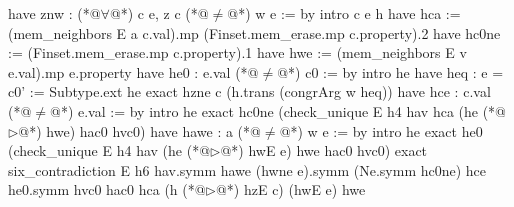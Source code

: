   have znw : (*@$\forall$@*) c e, z c (*@$\ne$@*) w e := by
    intro c e h
    have hca := (mem_neighbors E a c.val).mp (Finset.mem_erase.mp c.property).2
    have hc0ne := (Finset.mem_erase.mp c.property).1
    have hwe := (mem_neighbors E v e.val).mp e.property
    have he0 : e.val (*@$\ne$@*) c0 := by
      intro he
      have heq : e = c0' := Subtype.ext he
      exact hzne c (h.trans (congrArg w heq))
    have hce : c.val (*@$\ne$@*) e.val := by
      intro he
      exact hc0ne (check_unique E h4 hav hca (he (*@$\triangleright$@*) hwe) hac0 hvc0)
    have hawe : a (*@$\ne$@*) w e := by
      intro he
      exact he0 (check_unique E h4 hav (he (*@$\triangleright$@*) hwE e) hwe hac0 hvc0)
    exact six_contradiction E h6 hav.symm hawe (hwne e).symm
      (Ne.symm hc0ne) hce he0.symm hvc0 hac0 hca (h (*@$\triangleright$@*) hzE c) (hwE e) hwe
